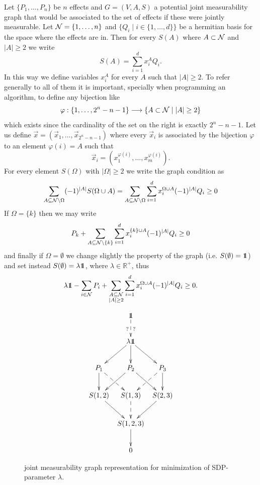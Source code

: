 \documentclass[10pt, a4paper]{amsart}
\begin{document}
Let $\{P_{1}, \ldots, P_{n}\}$ be $n$ effects and $G = (V,A,S) $ a potential joint measurability graph that would be associated to the set of effects if these were jointly measurable. Let $\mathcal{N} = \{1, \ldots , n\}$ and $\{Q_{i}\mid i\in\{ 1, \ldots , d \}\}$ be a hermitian basis for the space where the effects are in. Then for every 
$S(A)$ where $A\subset \mathcal{N} $ and $|A| \geq 2$ we write 
$$
S(A) = \sum_{i=1}^{d}x_{i}^{A}Q_{i}.
$$
In this way we define variables $x_{i}^{A}$ for every $A$ such that $|A|\geq 2$. To refer generally to all of them it is important, specially when programming an algorithm, to define any bijection like
$$
\varphi:\{1, \ldots , 2^{n}-n -1\}\longrightarrow \{A \subset \mathcal{N}\mid |A|\geq 2\}
$$ 
which exists since the cardinality of the set on the right is exactly $2^{n}-n-1$. 
Let us define $\vec{x} = (\vec{x}_{1}, \ldots, \vec{x}_{2^{n}-n-1})$ where every $\vec{x}_{i}$ is associated by the bijection $\varphi $ to an element $\varphi(i) = A$ such that 
$$
\vec{x}_{i} = (x_{1}^{\varphi(i) }, \ldots , x_{m}^{\varphi(i) }). 
$$ 
For every element $S(\Omega)$ with $|\Omega| \geq 2$ we write the graph condition as 
$$
\sum_{A\subseteq \mathcal{N} \backslash \Omega} (-1)^{|A|}S(\Omega \cup A)
=
\sum_{A\subseteq \mathcal{N} \backslash \Omega}
\sum_{i = 1}^{d}
x^{\Omega \cup A}_{i}
 (-1)^{|A|}
Q_{i}
\geq 0 
$$
If $\Omega = \{k\}$ then we may write 
$$
P_{k} + 
\sum_{A\subseteq \mathcal{N} \backslash \{k\}}
\sum_{i = 1}^{d}
x^{\{k\} \cup A}_{i}
 (-1)^{|A|}
Q_{i}
\geq 0
$$
and finally if $\Omega = \emptyset$ we change slightly the property of the graph (i.e. $S(\emptyset ) = \bbone$) and set instead $S(\emptyset ) = \lambda \bbone$, where $\lambda \in \mathbb{R}^{+}$, thus 
$$
\lambda\bbone - \sum_{i\in \N} P_{i} +\sum_{\substack{A\subseteq \N\\|A|\geq 2}}
\sum_{i = 1}^{d}
x^{\Omega \cup A}_{i}
 (-1)^{|A|}
Q_{i}
\geq 0.
$$
\begin{figure}[h]
$$
\xymatrix@C=2mm{
&&&\bbone \ar@{-->}[d]_{?}^{?}&&&\\
&&&\lambda\bbone \ar[dl]\ar[dr]\ar[d]&&&\\
&&P_{1}\ar@{-->}[dr]\ar[d]&P_{2}\ar[dl]\ar[dr]&P_{3}\ar[d]\ar@{-->}[dl]&&\\
&&S(1,2)\ar[dr]&S(1,3)\ar@{-->}[d]&S(2,3)\ar[dl]&&\\
&&&S(1,2,3)\ar[d]&&&\\
&&&0&&&
}
$$
\caption{joint measurability graph representation for minimization of SDP-parameter $\lambda$.}
\label{FIG:GRAPHFOR3_SDP}
\end{figure}
\end{document}

